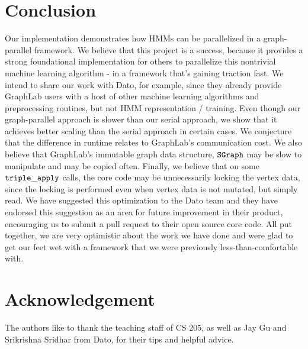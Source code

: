 \section{Conclusion}

Our implementation demonstrates how HMMs can be parallelized in a
graph-parallel framework.  We believe that this project is a success, because it provides a strong foundational implementation for others to parallelize this nontrivial machine learning algorithm - in a framework that's gaining traction fast.   We intend to share our work with Dato, for example, since they already provide GraphLab users with a host of other machine learning algorithms and preprocessing routines, but not HMM representation / training.  Even though our graph-parallel approach is slower than
our serial approach, we show that it achieves better scaling than the serial
approach in certain cases. We conjecture that the difference in runtime relates to GraphLab's communication cost.  We also believe that GraphLab's immutable graph data structure, $\tt{SGraph}$ may be slow to manipulate and may be copied often.  Finally, we  believe that on some $\tt{triple\_apply}$ calls, the core code may be unnecessarily locking the vertex data, since the locking is performed even when vertex data is not mutated, but simply read.   We have suggested this optimization to the Dato team and they have endorsed this suggestion as an area for future improvement in their product, encouraging us to submit a pull request to their open source core code.  All put together, we are very optimistic about the work we have done and were glad to get our feet wet with a framework that we were previously less-than-comfortable with.
\section*{Acknowledgement}

The authors like to thank the teaching staff of CS 205, as well as Jay Gu and
Srikrishna Sridhar from Dato, for their tips and helpful advice.
